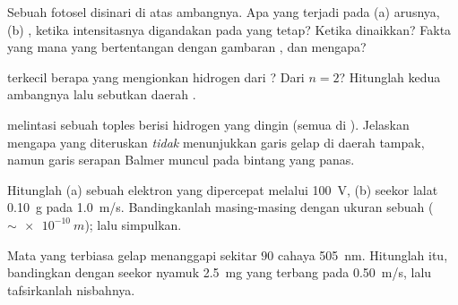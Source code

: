 \begin{exercise}[$\star\star$]\label{exo:g12:quantum-world:7}
Sebuah fotosel disinari di atas ambangnya. Apa yang terjadi pada (a) arusnya, (b)
, ketika intensitasnya digandakan pada  yang tetap? Ketika
 dinaikkan? Fakta yang mana yang bertentangan dengan gambaran , dan mengapa?
\end{exercise}

\begin{exercise}[$\star\star$]\label{exo:g12:quantum-world:8}
  terkecil berapa yang mengionkan  hidrogen dari ? Dari
$n = 2$? Hitunglah kedua  ambangnya lalu sebutkan daerah .
\end{exercise}

\begin{exercise}[$\star\star$]\label{exo:g12:quantum-world:9}
 melintasi sebuah toples berisi hidrogen yang dingin (semua  di ).
Jelaskan mengapa  yang diteruskan \emph{tidak} menunjukkan garis gelap di
daerah tampak, namun garis serapan Balmer muncul pada  bintang yang panas.
\end{exercise}

\begin{exercise}[$\star\star$]\label{exo:g12:quantum-world:10}
Hitunglah  (a) sebuah elektron yang dipercepat melalui
\qty{100}{V}, (b) seekor lalat \qty{0.10}{g} pada \qty{1.0}{m/s}. Bandingkanlah masing-masing dengan
ukuran sebuah  ($\sim \qty{e-10}{m}$); lalu simpulkan.
\end{exercise}

\begin{exercise}[$\star\star$]\label{exo:g12:quantum-world:11}
Mata yang terbiasa gelap menanggapi sekitar $90$  cahaya \qty{505}{nm}.
Hitunglah  itu, bandingkan dengan  seekor nyamuk \qty{2.5}{mg}
yang terbang pada \qty{0.50}{m/s}, lalu tafsirkanlah nisbahnya.
\end{exercise}

